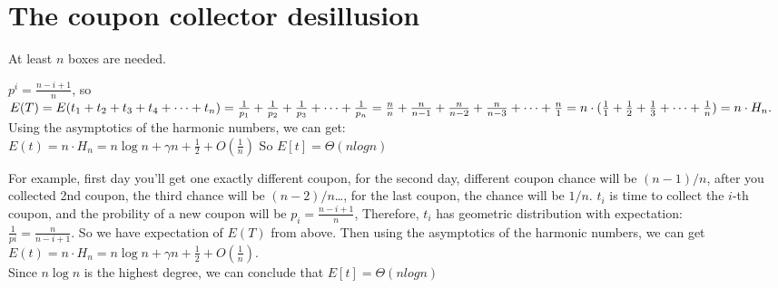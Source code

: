 \documentclass{article}
\begin{document}
\section{The coupon collector desillusion}
At least $n$ boxes are needed.\medskip\newline
{}
$p^i = \frac{n-i+1}{n}$, so $E(T) = E(t_1+t_2+t_3+t_4+\dots+t_n) 
\\=\frac{1}{p_1}+\frac{1}{p_2}+\frac{1}{p_3}+\dots+\frac{1}{p_n}
\\=\frac{n}{n}+\frac{n}{n-1}+\frac{n}{n-2}+\frac{n}{n-3}+\dots+\frac{n}{1}
\\=n\cdot (\frac{1}{1}+\frac{1}{2}+\frac{1}{3}+\dots+\frac{1}{n})
\\=n\cdot H_n.$
Using the asymptotics of the harmonic numbers, we can get:
\\$E(t)= n\cdot H_n = n\log{n}+\gamma n+\frac{1}{2}+O(\frac{1}{n})$
So $E[t] = \Theta(n log n)$\medskip\newline 
{}
For example, first day you'll get one exactly different coupon, for the second day, different coupon chance will be $(n-1)/n$, after you collected 2nd coupon, the third chance will be $(n-2)/n$\dots, for the last coupon, the chance will be $1/n$.
$t_i$ is time to collect the $i$-th coupon, and the probility of a new coupon will be $p_i = \frac{n-i+1}{n}$, Therefore, $t_i$ has geometric distribution with expectation:
\\$\frac{1}{pi} = \frac{n}{n-i+1}$. So we have expectation of $E(T)$ from above. Then using the asymptotics of the harmonic numbers, we can get\\$E(t)= n\cdot H_n = n\log{n}+\gamma n+\frac{1}{2}+O(\frac{1}{n})$. \\Since $n\log{n}$ is the highest degree, we can conclude that $E[t] = \Theta(n log n)$
\end{document}
